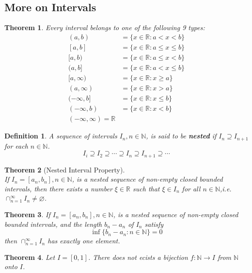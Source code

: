 \documentclass[8pt]{article}
\newtheorem{definition}{Definition}[section]
\newtheorem{theorem}{Theorem}[section]
\theoremstyle{definition}
\begin{document}
\subsection{More on Intervals}
\begin{theorem}\normalfont Every interval belongs to one of the following 9 types:
\[
\begin{aligned}
(a,b)&=\{x\in\mathbb{R}:a<x<b\}\\
[a,b]&=\{x\in\mathbb{R}:a\leq x\leq b\}\\
[a,b)&=\{x\in\mathbb{R}:a\leq x<b\}\\
(a,b]&=\{x\in\mathbb{R}:a<x\leq b\}\\
[a,\infty)&=\{x\in\mathbb{R}:x\geq a\}\\
(a,\infty)&=\{x\in\mathbb{R}:x>a\}\\
(-\infty,b]&=\{x\in\mathbb{R}:x\leq b\}\\
(-\infty,b)&=\{x\in\mathbb{R}:x<b\}\\
(-\infty,\infty)=\mathbb{R}
\end{aligned}
\]
\end{theorem}
\begin{definition}\normalfont A sequence of intervals $I_n, n\in\mathbb{N}$, is said to be \textbf{nested} if $I_n\supseteq I_{n+1}$ for each $n\in\mathbb{N}$.
\[
I_i\supseteq I_2\supseteq \cdots \supseteq I_n\supseteq I_{n+1}\supseteq \cdots
\]
\end{definition}
\begin{theorem}[Nested Interval Property]
\hfill\\\normalfont If $I_n=[a_n,b_n], n\in\mathbb{N}$, is a nested sequence of non-empty closed bounded intervals, then there exists a number $\xi\in\mathbb{R}$ such that $\xi\in I_n$ for all $n\in\mathbb{N}$,i.e. $\cap_{n=1}^\infty I_n\neq\varnothing$.
\end{theorem}
\begin{theorem}\normalfont If $I_n=[a_n,b_n],n\in\mathbb{N}$, is a nested sequence of non-empty closed bounded intervals, and the length $b_n-a_n$ of $I_n$ satisfy
\[
\inf\{b_n-a_n:n\in\mathbb{N}\}=0
\]
then $\cap_{n=1}^\infty I_n$ has exactly one element.
\end{theorem}
\begin{theorem}\normalfont Let $I=[0,1]$. There does not ecists a bijection $f:\mathbb{N}\to I$ from $\mathbb{N}$ onto $I$.
\end{theorem}
\clearpage
\end{document}
